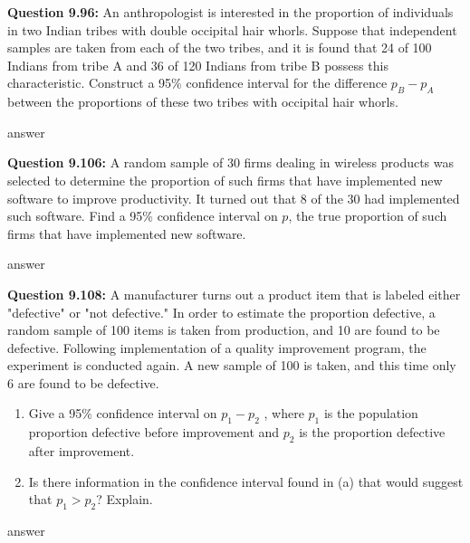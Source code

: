 \documentclass{article}
\begin{document}
\textbf{Question 9.96:}
An anthropologist is interested in the proportion
of individuals in two Indian tribes with double 
occipital hair whorls. Suppose that independent samples are
taken from each of the two tribes, and it is found that
24 of 100 Indians from tribe A and 36 of 120 Indians
from tribe B possess this characteristic. Construct a
95\% confidence interval for the difference $p_B − p_A$ 
between the proportions of these two tribes with occipital
hair whorls.
\begin{description}
    \item answer
\end{description}

\textbf{Question 9.106:}
A random sample of 30 firms dealing in wireless
products was selected to determine the proportion of
such firms that have implemented new software to 
improve productivity. It turned out that 8 of the 30 had
implemented such software. Find a 95\% confidence 
interval on $p$, the true proportion of such firms that have
implemented new software.
\begin{description}
    \item answer
\end{description}

\textbf{Question 9.108:}
A manufacturer turns out a product item that
is labeled either "defective" or "not defective." In order
to estimate the proportion defective, a random sample 
of 100 items is taken from production, and 10 are
found to be defective. Following implementation of a
quality improvement program, the experiment is 
conducted again. A new sample of 100 is taken, and this
time only 6 are found to be defective.
\begin{enumerate}[label = (\alph*) ]
    \item Give a 95\% confidence interval on $p_1 − p_2$ , 
    where $p_1$ is the population proportion defective before 
    improvement and $p_2$ is the proportion defective after
    improvement.
    \item Is there information in the confidence interval
    found in (a) that would suggest that $p_1 > p_2$? 
    Explain.
\end{enumerate}
\begin{description}
    \item answer
\end{description}
\end{document}
